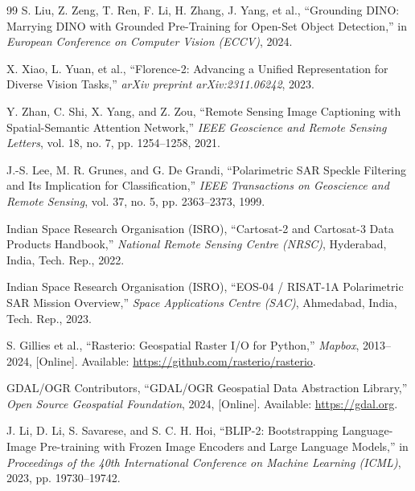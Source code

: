 \documentclass[12pt,a4paper]{report}
\begin{document}
\begin{thebibliography}{99}
 S. Liu, Z. Zeng, T. Ren, F. Li, H. Zhang, J. Yang, et al., ``Grounding DINO: Marrying DINO with Grounded Pre-Training for Open-Set Object Detection,'' in \textit{European Conference on Computer Vision (ECCV)}, 2024.

 X. Xiao, L. Yuan, et al., ``Florence-2: Advancing a Unified Representation for Diverse Vision Tasks,'' \textit{arXiv preprint arXiv:2311.06242}, 2023.

 Y. Zhan, C. Shi, X. Yang, and Z. Zou, ``Remote Sensing Image Captioning with Spatial-Semantic Attention Network,'' \textit{IEEE Geoscience and Remote Sensing Letters}, vol. 18, no. 7, pp. 1254--1258, 2021.

 J.-S. Lee, M. R. Grunes, and G. De Grandi, ``Polarimetric SAR Speckle Filtering and Its Implication for Classification,'' \textit{IEEE Transactions on Geoscience and Remote Sensing}, vol. 37, no. 5, pp. 2363--2373, 1999.

 Indian Space Research Organisation (ISRO), ``Cartosat-2 and Cartosat-3 Data Products Handbook,'' \textit{National Remote Sensing Centre (NRSC)}, Hyderabad, India, Tech. Rep., 2022.

 Indian Space Research Organisation (ISRO), ``EOS-04 / RISAT-1A Polarimetric SAR Mission Overview,'' \textit{Space Applications Centre (SAC)}, Ahmedabad, India, Tech. Rep., 2023.

 S. Gillies et al., ``Rasterio: Geospatial Raster I/O for Python,'' \textit{Mapbox}, 2013--2024, [Online]. Available: \url{https://github.com/rasterio/rasterio}.

 GDAL/OGR Contributors, ``GDAL/OGR Geospatial Data Abstraction Library,'' \textit{Open Source Geospatial Foundation}, 2024, [Online]. Available: \url{https://gdal.org}.

 J. Li, D. Li, S. Savarese, and S. C. H. Hoi, ``BLIP-2: Bootstrapping Language-Image Pre-training with Frozen Image Encoders and Large Language Models,'' in \textit{Proceedings of the 40th International Conference on Machine Learning (ICML)}, 2023, pp. 19730--19742.

\end{thebibliography}
\end{document}
